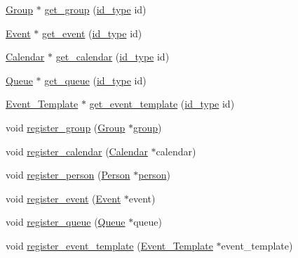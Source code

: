 \begin{DoxyCompactItemize}
\item 
\hyperlink{classGroup}{Group} $\ast$ \hyperlink{classstorage_1_1DataStorage_a53e3931141b50ff3d5bfd7e682092091}{get\_\-group} (\hyperlink{types_8h_a0b60c08a3ab1435cccc5643d32d8ccee}{id\_\-type} id)
\item 
\hyperlink{classEvent}{Event} $\ast$ \hyperlink{classstorage_1_1DataStorage_af68ca095bb27db3b8532045f77b5ae73}{get\_\-event} (\hyperlink{types_8h_a0b60c08a3ab1435cccc5643d32d8ccee}{id\_\-type} id)
\item 
\hyperlink{classCalendar}{Calendar} $\ast$ \hyperlink{classstorage_1_1DataStorage_a38b24aa35d0f1159200c78e53a0c99bb}{get\_\-calendar} (\hyperlink{types_8h_a0b60c08a3ab1435cccc5643d32d8ccee}{id\_\-type} id)
\item 
\hyperlink{classQueue}{Queue} $\ast$ \hyperlink{classstorage_1_1DataStorage_a38f0afa3026ff4c41e25c85648d24cd1}{get\_\-queue} (\hyperlink{types_8h_a0b60c08a3ab1435cccc5643d32d8ccee}{id\_\-type} id)
\item 
\hyperlink{classEvent__Template}{Event\_\-Template} $\ast$ \hyperlink{classstorage_1_1DataStorage_a085a420bbfdb5aad5ca5ed2396bca656}{get\_\-event\_\-template} (\hyperlink{types_8h_a0b60c08a3ab1435cccc5643d32d8ccee}{id\_\-type} id)
\item 
void \hyperlink{classstorage_1_1DataStorage_aa29c972a9d8e25c54703435b79060ccf}{register\_\-group} (\hyperlink{classGroup}{Group} $\ast$\hyperlink{group__content_8h_a27517aa1480ab2d9bfe5d62e693b33eb}{group})
\item 
void \hyperlink{classstorage_1_1DataStorage_a4aea70365b132555020159c04121a9a0}{register\_\-calendar} (\hyperlink{classCalendar}{Calendar} $\ast$calendar)
\item 
void \hyperlink{classstorage_1_1DataStorage_ab397fd5fc17fb58e45b2968b165c95dd}{register\_\-person} (\hyperlink{classPerson}{Person} $\ast$\hyperlink{group__content_8h_ab8664e6fd42f01eeaad084b5e20eb54e}{person})
\item 
void \hyperlink{classstorage_1_1DataStorage_a2c63723d6bb413a0d630b05a045935e1}{register\_\-event} (\hyperlink{classEvent}{Event} $\ast$event)
\item 
void \hyperlink{classstorage_1_1DataStorage_a78b6e15d0d878cc5113cba50dae7c73b}{register\_\-queue} (\hyperlink{classQueue}{Queue} $\ast$queue)
\item 
void \hyperlink{classstorage_1_1DataStorage_a3984bdbb2a2aecfaca0a4745df0f7850}{register\_\-event\_\-template} (\hyperlink{classEvent__Template}{Event\_\-Template} $\ast$event\_\-template)
\end{DoxyCompactItemize}
